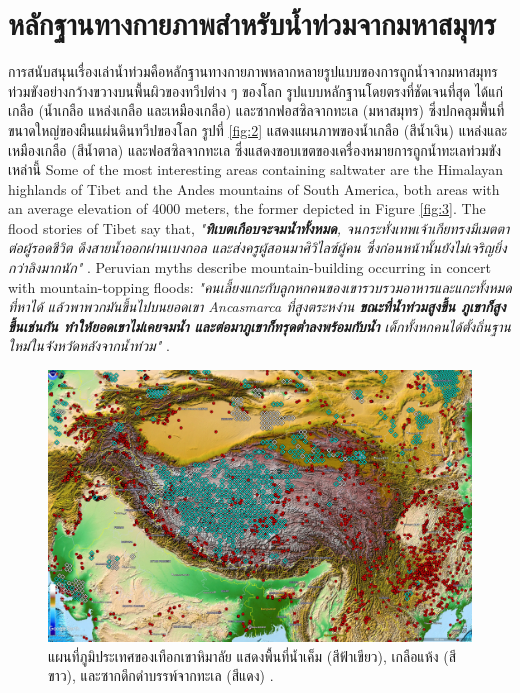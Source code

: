 \documentclass[10pt,twocolumn,letterpaper]{article}
\begin{document}
\section{หลักฐานทางกายภาพสำหรับน้ำท่วมจากมหาสมุทร}

การสนับสนุนเรื่องเล่าน้ำท่วมคือหลักฐานทางกายภาพหลากหลายรูปแบบของการถูกน้ำจากมหาสมุทรท่วมขังอย่างกว้างขวางบนพื้นผิวของทวีปต่าง ๆ ของโลก รูปแบบหลักฐานโดยตรงที่ชัดเจนที่สุด ได้แก่ เกลือ (น้ำเกลือ แหล่งเกลือ และเหมืองเกลือ) และซากฟอสซิลจากทะเล (มหาสมุทร) ซึ่งปกคลุมพื้นที่ขนาดใหญ่ของผืนแผ่นดินทวีปของโลก รูปที่ \ref{fig:2} แสดงแผนภาพของน้ำเกลือ (สีน้ำเงิน) แหล่งและเหมืองเกลือ (สีน้ำตาล) และฟอสซิลจากทะเล \cite{15,16,86,87} ซึ่งแสดงขอบเขตของเครื่องหมายการถูกน้ำทะเลท่วมขังเหล่านี้
Some of the most interesting areas containing saltwater are the Himalayan highlands of Tibet and the Andes mountains of South America, both areas with an average elevation of 4000 meters, the former depicted in Figure \ref{fig:3}. The flood stories of Tibet say that, \textit{"\textbf{ทิเบตเกือบจะจมน้ำทั้งหมด}, จนกระทั่งเทพเจ้าเกียทรงมีเมตตาต่อผู้รอดชีวิต ดึงสายน้ำออกผ่านเบงกอล และส่งครูผู้สอนมาศิวิไลซ์ผู้คน ซึ่งก่อนหน้านั้นยังไม่เจริญยิ่งกว่าลิงมากนัก"} \cite{3}. Peruvian myths describe mountain-building occurring in concert with mountain-topping floods: \textit{"คนเลี้ยงแกะกับลูกหกคนของเขารวบรวมอาหารและแกะทั้งหมดที่หาได้ แล้วพาพวกมันขึ้นไปบนยอดเขา Ancasmarca ที่สูงตระหง่าน \textbf{ขณะที่น้ำท่วมสูงขึ้น ภูเขาก็สูงขึ้นเช่นกัน ทำให้ยอดเขาไม่เคยจมน้ำ และต่อมาภูเขาก็ทรุดต่ำลงพร้อมกับน้ำ} เด็กทั้งหกคนได้ตั้งถิ่นฐานใหม่ในจังหวัดหลังจากน้ำท่วม"} \cite{3}.

\begin{figure}[t]
\begin{center}
   \includegraphics[width=1\linewidth]{tibet.jpg}
\end{center}
   \caption{แผนที่ภูมิประเทศของเทือกเขาหิมาลัย แสดงพื้นที่น้ำเค็ม (สีฟ้าเขียว), เกลือแห้ง (สีขาว), และซากดึกดำบรรพ์จากทะเล (สีแดง) \cite{15,16,86,87}.}
\label{fig:3}
\label{fig:onecol}
\end{figure}
\end{document}
